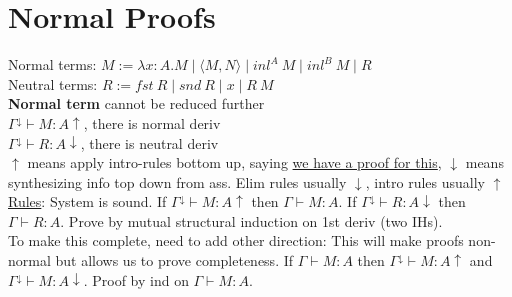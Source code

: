 \section{Normal Proofs}
Normal terms: $M := \lambda x: A.M \mid \langle M,N \rangle \mid
inl^A\ M \mid inl^B\ M \mid R$
\\ Neutral terms: $R := fst\ R \mid snd\ R \mid x \mid R\ M$
\\ \textbf{Normal term} cannot be reduced further
\\$\Gamma^{\downarrow} \vdash M : A \uparrow$, there is normal deriv
\\ $\Gamma^{\downarrow} \vdash R : A \downarrow$, there is neutral
deriv
\\ $\uparrow$ means apply intro-rules bottom up, saying \underline{we
  have a proof for this}, $\downarrow$ means synthesizing info top
down from ass. Elim rules usually $\downarrow$, intro rules usually $\uparrow$
\\ \underline{Rules}:
System is sound. If $\Gamma^{\downarrow} \vdash M : A \uparrow$ then
$\Gamma \vdash M :A$. If $\Gamma^{\downarrow} \vdash R : A \downarrow$
then $\Gamma \vdash R : A$. Prove by mutual structural induction on
1st deriv (two IHs).
\\ To make this complete, need to add other direction:
 This will make proofs non-normal but allows us to prove
completeness. If $\Gamma \vdash M : A$ then $\Gamma^\downarrow \vdash
M : A \uparrow$ and $\Gamma^{\downarrow} \vdash M : A
\downarrow$. Proof by ind on $\Gamma \vdash M : A$.
\color{Brown}
